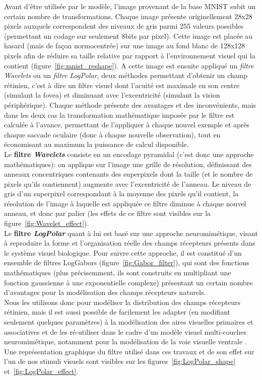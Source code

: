 Avant d'être utilisée par le modèle, l'image provenant de la base MNIST subit un certain nombre de transformations.
Chaque image présente originellement 28x28 pixels auxquels correspondent des niveaux de gris parmi 255 valeurs possibles (permettant un codage sur seulement 8bits par pixel). Cette image est placée au hasard (mais de façon normocentrée) sur une image au fond blanc de 128x128 pixels afin de réduire sa taille relative par rapport à l'environnement visuel qui la contient (figure~\ref{fig:mnist_reshape}).
A cette image est ensuite appliqué un \textit{filtre Wavelets} ou un \textit{filtre LogPolar}, deux méthodes permettant d'obtenir un champ rétinien, c'est à dire un filtre visuel dont l'acuité est maximale en son centre (simulant la fovea) et diminuant avec l'excentricité (simulant la vision périphérique).
Chaque méthode présente des avantages et des inconvénients, mais dans les deux cas la transformation mathématique imposée par le filtre est calculée à l'avance, permettant de l'appliquer à chaque nouvel exemple et après chaque saccade oculaire (donc à chaque nouvelle observation), tout en économisant au maximum la puissance de calcul disponible.\autocite{Kortum1996}\\
Le \textbf{filtre \textit{Wavelets}} consiste en un encodage pyramidal (c'est donc une approche mathématiques): on applique sur l'image une grille de résolution, définissant des anneaux concentriques contenants des superpixels dont la taille (et le nombre de pixels qu'ils contiennent) augmente avec l'excentricité de l'anneau. Le niveau de gris d'un superpixel correspondant à la moyenne des pixels qu'il contient, la résolution de l'image à laquelle est appliquée ce filtre diminue à chaque nouvel anneau, et donc par palier (les effets de ce filtre sont visibles sur la figure~\ref{fig:Wavelet_effect}). \autocite{Kortum1996} \\
Le \textbf{filtre \textit{LogPolar}} quant à lui est basé sur une approche neuromimétique, visant à reproduire la forme et l'organisation réelle des champs récepteurs présents dans le système visuel biologique. Pour suivre cette approche, il est constitué d'un ensemble de filtres LogGabors (figure~\ref{fig:Gabor_filter}), qui sont des fonctions mathématiques (plus précisemment, ils sont construits en multipliant une fonction gaussienne à une exponentielle complexe) présentant un certain nombre d'avantages pour la modélisation des champs récepteurs naturels\autocite{Fischer2007, SLIP}. \\
Nous les utilisons donc pour modéliser la distribution des champs récepteurs rétinien, mais il est aussi possible de facilement les adapter (en modifiant seulement quelques paramètres) à la modélisation des aires visuelles primaires et associatives et de les ré-utiliser dans le cadre d'un modèle visuel multi-couches neuromimétique, notamment pour la modélisation de la voie visuelle ventrale \autocite{Freeman2011}. \\
Une représentation graphique du filtre utilisé dans ces travaux et de son effet sur l'un de nos stimuli visuels sont visibles sur les figures~\ref{fig:LogPolar_shape} et~\ref{fig:LogPolar_effect}. \\


